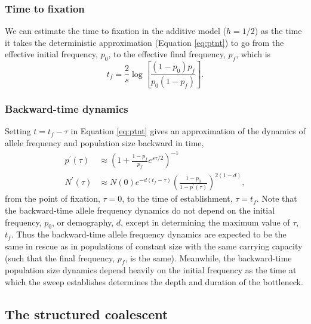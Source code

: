 \documentclass[]{article}
\begin{document}
\subsubsection*{Time to fixation}
\label{sec:fixation_time}

We can estimate the time to fixation in the additive model ($h=1/2$) as the time it takes the deterministic approximation (Equation \ref{eq:ptnt}) to go from the effective initial frequency, $p_0$, to the effective final frequency, $p_f$, which is \citep[equation 5.3.13 in ][]{crow1970introduction}
\begin{equation}\label{eq:tfix}
t_f = \frac{2}{s} \log\left[ \frac{(1-p_0)p_f}{p_0(1-p_f)}\right].
\end{equation}

\subsubsection*{Backward-time dynamics}
\label{sec:backward_dynamics}

Setting $t = t_f - \tau$ in Equation \ref{eq:ptnt} gives an approximation of the dynamics of allele frequency and population size backward in time,
\begin{equation}\begin{aligned}\label{eq:backwardsptnt}
p^\prime(\tau) &\approx \left(1 + \frac{1 - p_f}{p_f} e^{s \tau/2} \right)^{-1}\\
N^\prime(\tau) &\approx N(0) e^{-d (t_f-\tau)} \left(\frac{1-p_0}{1-p^\prime(\tau)}\right)^{2(1-d)},
\end{aligned}\end{equation}
from the point of fixation, $\tau=0$, to the time of establishment, $\tau=t_f$.
Note that the backward-time allele frequency dynamics do not depend on the initial frequency, $p_0$, or demography, $d$, except in determining the maximum value of $\tau$, $t_f$.
Thus the backward-time allele frequency dynamics are expected to be the same in rescue as in populations of constant size with the same carrying capacity (such that the final frequency, $p_f$, is the same).
Meanwhile, the backward-time population size dynamics depend heavily on the initial frequency as the time at which the sweep establishes determines the depth and duration of the bottleneck. 

\subsection*{The structured coalescent}
\end{document}
